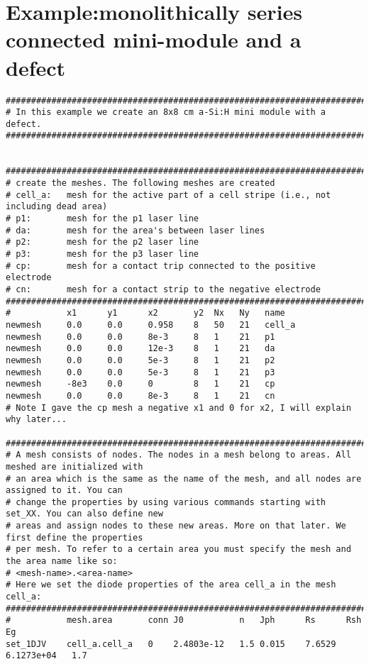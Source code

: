\documentclass[noshowpacs,preprintnumbers,amsmath,amssymb, letter]{revtex4}
\begin{document}
\section{Example:monolithically series connected mini-module and a defect}

\begin{small}
\begin{verbatim}
###################################################################################################
# In this example we create an 8x8 cm a-Si:H mini module with a defect.
###################################################################################################


###################################################################################################
# create the meshes. The following meshes are created
# cell_a:	mesh for the active part of a cell stripe (i.e., not including dead area)
# p1:		mesh for the p1 laser line
# da:		mesh for the area's between laser lines
# p2:		mesh for the p2 laser line
# p3:		mesh for the p3 laser line
# cp:		mesh for a contact trip connected to the positive electrode
# cn:		mesh for a contact strip to the negative electrode
###################################################################################################
#           x1      y1      x2       y2  Nx   Ny   name   
newmesh     0.0     0.0     0.958    8   50   21   cell_a
newmesh     0.0     0.0     8e-3     8   1    21   p1
newmesh     0.0     0.0     12e-3    8   1    21   da
newmesh     0.0     0.0     5e-3     8   1    21   p2
newmesh     0.0     0.0     5e-3     8   1    21   p3
newmesh     -8e3    0.0     0        8   1    21   cp
newmesh     0.0     0.0     8e-3     8   1    21   cn
# Note I gave the cp mesh a negative x1 and 0 for x2, I will explain why later...

###################################################################################################
# A mesh consists of nodes. The nodes in a mesh belong to areas. All meshed are initialized with 
# an area which is the same as the name of the mesh, and all nodes are assigned to it. You can 
# change the properties by using various commands starting with set_XX. You can also define new 
# areas and assign nodes to these new areas. More on that later. We first define the properties 
# per mesh. To refer to a certain area you must specify the mesh and the area name like so: 
# <mesh-name>.<area-name>
# Here we set the diode properties of the area cell_a in the mesh cell_a:
###################################################################################################
#           mesh.area       conn J0           n   Jph      Rs      Rsh          Eg
set_1DJV    cell_a.cell_a   0    2.4803e-12   1.5 0.015    7.6529  6.1273e+04   1.7


\end{verbatim}
\end{small}
\end{document}
